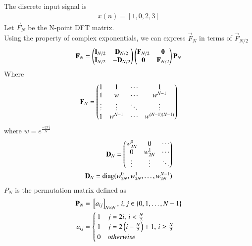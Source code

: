 \documentclass[journal,12pt,twocolumn]{IEEEtran}
\begin{document}
The discrete input signal is
\begin{align}
    x(n)=[1,0,2,3]
\end{align}
Let $\vec{F}_N$ be the N-point DFT matrix.\\
Using the property of complex exponentials, we can express $\vec{F}_N$ in terms of $\vec{F}_{N/2}$
\begin{align}
    \mathbf{F}_N=\begin{pmatrix}\mathbf{I}_{N/2} & \mathbf{D}_{N/2} \\ \mathbf{I}_{N/2} & -\mathbf{D}_{N/2}\end{pmatrix}\begin{pmatrix}\mathbf{F}_{N/2} & \mathbf{0} \\ \mathbf{0} & \mathbf{F}_{N/2}\end{pmatrix}\mathbf{P}_N
\end{align}
Where
\begin{align}
    \mathbf{F}_N=\begin{pmatrix}1 & 1 & \cdots & 1 \\ 1 & w & \cdots & w^{N-1} \\ \vdots & \vdots & \ddots & \vdots\\ 1 & w^{N-1} & \cdots & w^{(N-1)(N-1)}\end{pmatrix}
\end{align}
where $w=e^{\frac{-2\pi j}{N}}$
\begin{align}
\mathbf{D}_N=\begin{pmatrix}w_{2N}^0 & 0 & \cdots\\ 0 & w_{2N}^1 &  \cdots \\ \vdots & \vdots & \ddots \end{pmatrix}\\
\mathbf{D}_N=\text{diag}(w_{2N}^0,w_{2N}^1,\ldots,w_{2N}^{N-1})
\end{align}
$P_{N}$ is the permutation matrix defined as 
\begin{align}
    \mathbf{P}_N&={}\left[a_{ij}\right]_{N\times N},\, i,j\in\left\{0,1,\ldots,N-1\right\}\\
	a_{ij} &=
\begin{cases}
1 & j=2i,\, i<\frac{N}{2}\\
1 &  j=2\left(i-\frac{N}{2}\right)+1,\, i\geq \frac{N}{2}\\
0 & otherwise
\end{cases}
\label{eq:final_result}
\end{align}
\end{document}
